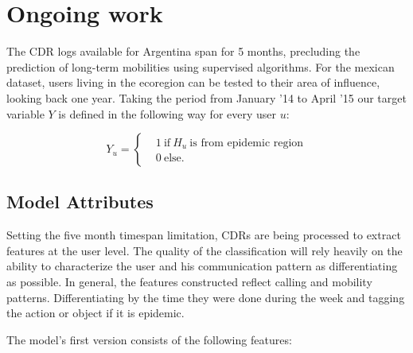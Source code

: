 \section{Ongoing work}

The CDR logs available for Argentina span for 5 months, precluding the prediction of long-term mobilities using supervised algorithms. For the mexican dataset, users living in the ecoregion can be tested to their area of influence, looking back one year. Taking the period from January '14 to April '15 our target variable $Y $ is defined in the following way for every user $u$: 

\[
    Y_u =
      \begin{cases}
        &1 \ \mbox{if} \ H_u \ \mbox{is from epidemic region}\\
        &0 \ \mbox{else}.
      \end{cases}
    \]
    
\subsection{Model Attributes}

Setting the five month timespan limitation, CDRs are being processed to extract features at the user level. The quality of the classification will rely heavily on the ability to characterize the user and his communication pattern as differentiating as possible. In general, the features constructed reflect calling and mobility patterns. Differentiating by the time they were done during the week and tagging the action or object if it is epidemic. 

The model's first version consists of the following features:

